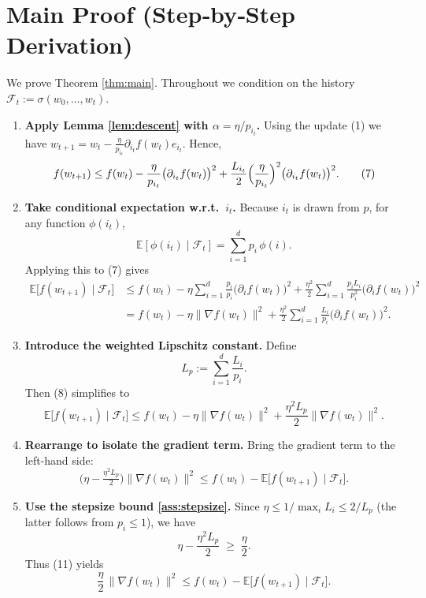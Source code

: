 \documentclass{article}
\begin{document}
\section*{Main Proof (Step‑by‑Step Derivation)}
We prove Theorem \ref{thm:main}. Throughout we condition on the history $\mathcal{F}_t:=\sigma(w_0,\dots ,w_t)$.

\begin{enumerate}[label=[Step \arabic*], leftmargin=*]
\item \textbf{Apply Lemma \ref{lem:descent} with $\alpha=\eta/p_{i_t}$.}  
Using the update (1) we have $w_{t+1}=w_t-\frac{\eta}{p_{i_t}}\partial_{i_t}f(w_t)e_{i_t}$.  
Hence,
\[
f(w_{t+1})\le
f(w_t)-\frac{\eta}{p_{i_t}}\bigl(\partial_{i_t}f(w_t)\bigr)^{2}
+\frac{L_{i_t}}{2}\Bigl(\frac{\eta}{p_{i_t}}\Bigr)^{2}
\bigl(\partial_{i_t}f(w_t)\bigr)^{2}.
\tag{7}
\]

\item \textbf{Take conditional expectation w.r.t.\ $i_t$.}  
Because $i_t$ is drawn from $p$, for any function $\phi(i_t)$,
\[
\mathbb{E}[\phi(i_t)\mid\mathcal{F}_t]=\sum_{i=1}^{d}p_i\,\phi(i).
\]
Applying this to (7) gives
\[
\begin{aligned}
\mathbb{E}\!\bigl[f(w_{t+1})\mid\mathcal{F}_t\bigr]
&\le f(w_t)-\eta\sum_{i=1}^{d}
\frac{p_i}{p_i}\bigl(\partial_i f(w_t)\bigr)^{2}
+\frac{\eta^{2}}{2}\sum_{i=1}^{d}
\frac{p_i L_i}{p_i^{2}}\bigl(\partial_i f(w_t)\bigr)^{2}\\
&= f(w_t)-\eta\|\nabla f(w_t)\|^{2}
+\frac{\eta^{2}}{2}\sum_{i=1}^{d}\frac{L_i}{p_i}
\bigl(\partial_i f(w_t)\bigr)^{2}.
\end{aligned}
\tag{8}
\]

\item \textbf{Introduce the weighted Lipschitz constant.}  
Define
\[
L_{p}:=\sum_{i=1}^{d}\frac{L_i}{p_i}.
\tag{9}
\]
Then (8) simplifies to
\[
\mathbb{E}\!\bigl[f(w_{t+1})\mid\mathcal{F}_t\bigr]
\le f(w_t)-\eta\|\nabla f(w_t)\|^{2}
+\frac{\eta^{2}L_{p}}{2}\|\nabla f(w_t)\|^{2}.
\tag{10}
\]

\item \textbf{Rearrange to isolate the gradient term.}  
Bring the gradient term to the left-hand side:
\[
\bigl(\eta-\tfrac{\eta^{2}L_{p}}{2}\bigr)\|\nabla f(w_t)\|^{2}
\le f(w_t)-\mathbb{E}\!\bigl[f(w_{t+1})\mid\mathcal{F}_t\bigr].
\tag{11}
\]

\item \textbf{Use the stepsize bound \eqref{ass:stepsize}.}  
Since $\eta\le 1/\max_i L_i\le 2/L_{p}$ (the latter follows from $p_i\le1$), we have
\[
\eta-\frac{\eta^{2}L_{p}}{2}\;\ge\;\frac{\eta}{2}.
\tag{12}
\]
Thus (11) yields
\[
\frac{\eta}{2}\,\|\nabla f(w_t)\|^{2}
\le
f(w_t)-\mathbb{E}\!\bigl[f(w_{t+1})\mid\mathcal{F}_t\bigr].
\tag{13}
\]


\end{enumerate}
\end{document}
